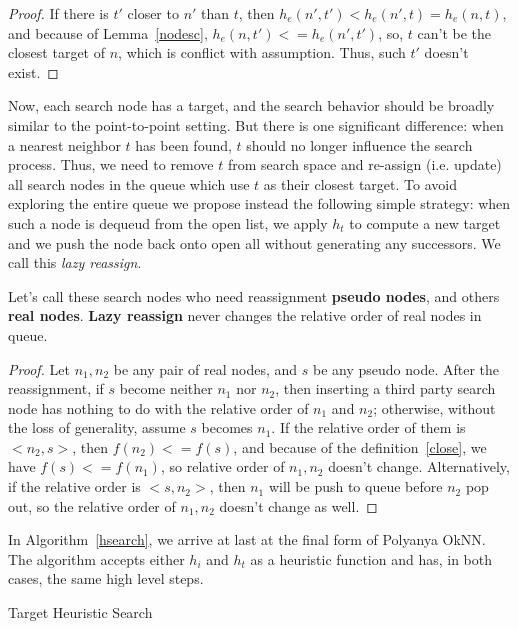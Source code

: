 \begin{proof}
  If there is $t'$ closer to $n'$ than $t$, then $h_e(n', t') <
  h_e(n', t) = h_e(n, t)$, and because of Lemma~\ref{nodesc},
  $h_e(n, t') <= h_e(n', t')$, so,
  $t$ can't be the closest target of $n$, which is conflict with assumption. Thus, such $t'$
  doesn't exist.
\end{proof}

Now, each search node has a target, and the search behavior should be broadly similar to 
the point-to-point setting.
But there is one significant difference: when a nearest neighbor $t$ has been found, $t$ should
no longer influence the search process. Thus, we need to remove $t$ from search space and 
re-assign (i.e. update) all search nodes in the queue which use $t$ as their closest target. 
To avoid exploring the entire queue we propose instead the following simple strategy: 
when such a node is dequeud from the open list, we apply $h_t$ to compute a new target
and we push the node back onto open all without generating any successors. 
We call this \textit{lazy reassign}.

\begin{lemma}\label{lazy-reassign}
  Let's call these search nodes who need reassignment \textbf{pseudo nodes}, and others
  \textbf{real nodes}. \textbf{Lazy reassign} never changes the relative order of real
  nodes in queue.
\end{lemma}

\begin{proof}
  Let $n_1, n_2$ be any pair of real nodes, and $s$ be any pseudo node.  After the reassignment,
  if $s$ become neither $n_1$ nor $n_2$, then inserting a third party search node has nothing to do with the relative order of $n_1$
  and $n_2$; otherwise, without the loss of generality, assume $s$ becomes $n_1$. If the relative
  order of them is $<n_2, s>$, then $f(n_2) <= f(s)$, and
  because of the definition~\ref{close}, we have $f(s) <= f(n_1)$, so
  relative order of $n_1, n_2$ doesn't change. Alternatively, if the relative order is $<s, n_2>$, then $n_1$  will be push to queue before $n_2$ pop out, so the relative order of $n_1, n_2$ doesn't
  change as well.%
\end{proof}

In Algorithm~\ref{hsearch}, we arrive at last at the final form of Polyanya OkNN. The algorithm
accepts either $h_i$ and $h_t$ as a heuristic function and has, in both cases, the same high level steps.

\begin{algorithm}[t]
  
  \caption{Target Heuristic Search}
  \label{hsearch}
\end{algorithm}


